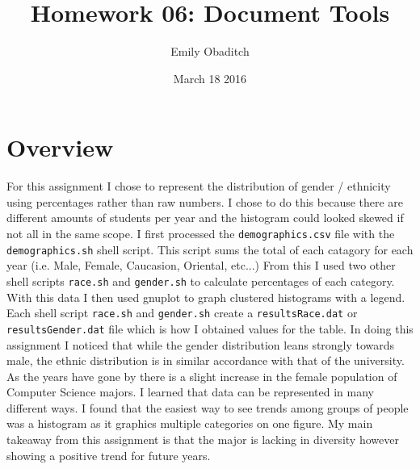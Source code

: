 \documentclass{article}
\title{Homework 06: Document Tools}
\author{Emily Obaditch}
\date{March 18 2016}
\begin{document}
 

\maketitle 

\section*{Overview}
    For this assignment I chose to represent the distribution of gender 
/ ethnicity using percentages rather than raw numbers.  I chose to do 
this because there are different amounts of students per year and the 
histogram could looked skewed if not all in the same scope.  I first 
processed the \verb|demographics.csv| file with the 
\verb|demographics.sh| shell script.  This script sums the total of each 
catagory for each year (i.e. Male, Female, Caucasion, Oriental, etc...)  
From this I used two other shell scripts \verb|race.sh| and 
\verb|gender.sh| to calculate percentages of each category.  With this 
data I then used gnuplot to graph clustered histograms with a legend.  
Each shell script \verb|race.sh| and \verb|gender.sh| create a 
\verb|resultsRace.dat| or \verb|resultsGender.dat| file which is how I 
obtained values for the table.
    In doing this assignment I noticed that while the gender 
distribution leans strongly towards male, the ethnic distribution is in 
similar accordance with that of the university.  As the years have gone 
by there is a slight increase in the female population of Computer 
Science majors.  I learned that data can be represented in many 
different ways.  I found that the easiest way to see trends among groups 
of people was a histogram as it graphics multiple categories on one 
figure.  My main takeaway from this assignment is that the major is 
lacking in diversity however showing a positive trend for future years.
    
\end{document}
